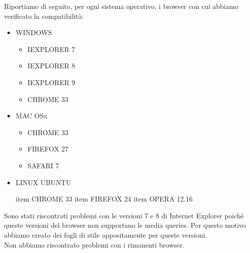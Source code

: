 Riportiamo di seguito, per ogni sistema operativo, i browser con cui abbiamo verificato la compatibilit\`a:
\begin{itemize}
		\item WINDOWS
		\begin{itemize}
			\item IEXPLORER 7
			\item IEXPLORER 8
			\item IEXPLORER 9
			\item CHROME 33
		\end{itemize}
		\item MAC OSx
		\begin{itemize}
			\item CHROME 33
			\item FIREFOX 27
			\item SAFARI 7
		\end{itemize}
		\item LINUX UBUNTU
		\begin{itemize}
			item CHROME 33
			item FIREFOX 24
			item OPERA 12.16
		\end{itemize}
\end{itemize}

Sono stati riscontrati problemi con le versioni 7 e 8 di Internet Explorer poich\`e queste versioni del browser non supportano le media queries. Per questo motivo abbiamo creato dei fogli di stile appositamente per queste versioni.
\\Non abbiamo riscontrato problemi con i rimanenti browser.
